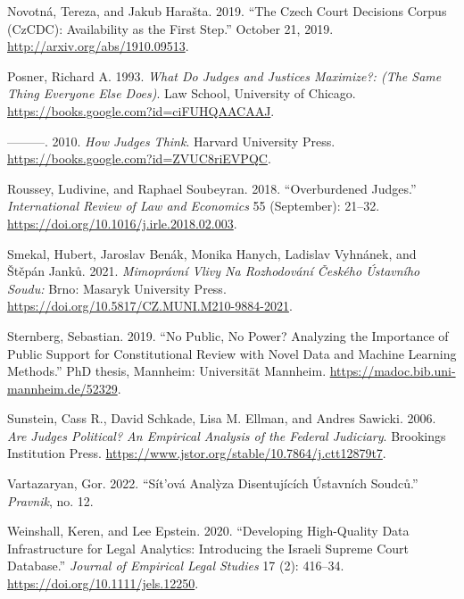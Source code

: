 \documentclass[
  11pt,
]{article}
\newlength{\cslhangindent}
\newenvironment{CSLReferences}[2] %
 {%
  \setlength{\parindent}{0pt}
  \ifodd #1 \everypar{\setlength{\hangindent}{\cslhangindent}}\ignorespaces\fi
  \ifnum #2 > 0
  \setlength{\parskip}{#2\baselineskip}
  \fi
 }%
 {}
\begin{document}
\begin{CSLReferences}{1}{0}
\leavevmode{}%
Novotná, Tereza, and Jakub Harašta. 2019. {``The {Czech Court Decisions
Corpus} ({CzCDC}): {Availability} as the {First Step}.''} October 21,
2019. \url{http://arxiv.org/abs/1910.09513}.

\leavevmode{}%
Posner, Richard A. 1993. \emph{What {Do Judges} and {Justices
Maximize}?: (The {Same Thing Everyone Else Does})}. {Law School,
University of Chicago}. \url{https://books.google.com?id=ciFUHQAACAAJ}.

\leavevmode{}%
---------. 2010. \emph{How {Judges Think}}. {Harvard University Press}.
\url{https://books.google.com?id=ZVUC8riEVPQC}.

\leavevmode{}%
Roussey, Ludivine, and Raphael Soubeyran. 2018. {``Overburdened
Judges.''} \emph{International Review of Law and Economics} 55
(September): 21--32. \url{https://doi.org/10.1016/j.irle.2018.02.003}.

\leavevmode{}%
Smekal, Hubert, Jaroslav Benák, Monika Hanych, Ladislav Vyhnánek, and
Štěpán Janků. 2021. \emph{Mimoprávní Vlivy Na Rozhodování Českého
{Ústavního} Soudu:} {Brno}: {Masaryk University Press}.
\url{https://doi.org/10.5817/CZ.MUNI.M210-9884-2021}.

\leavevmode{}%
Sternberg, Sebastian. 2019. {``No Public, No Power? {Analyzing} the
Importance of Public Support for Constitutional Review with Novel Data
and Machine Learning Methods.''} PhD thesis, {Mannheim}: {Universität
Mannheim}. \url{https://madoc.bib.uni-mannheim.de/52329}.

\leavevmode{}%
Sunstein, Cass R., David Schkade, Lisa M. Ellman, and Andres Sawicki.
2006. \emph{Are {Judges Political}? {An Empirical Analysis} of the
{Federal Judiciary}}. {Brookings Institution Press}.
\url{https://www.jstor.org/stable/10.7864/j.ctt12879t7}.

\leavevmode{}%
Vartazaryan, Gor. 2022. {``Sít'ová Analỳza Disentujících Ústavních
Soudců.''} \emph{Pravnik}, no. 12.

\leavevmode{}%
Weinshall, Keren, and Lee Epstein. 2020. {``Developing {High-Quality
Data Infrastructure} for {Legal Analytics}: {Introducing} the {Israeli
Supreme Court Database}.''} \emph{Journal of Empirical Legal Studies} 17
(2): 416--34. \url{https://doi.org/10.1111/jels.12250}.


\end{CSLReferences}
\end{document}
